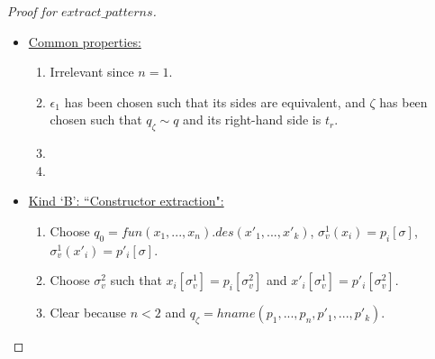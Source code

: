 \documentclass[11pt]{article} %
\begin{document}
\begin{proof}[Proof for $extract\_patterns$]
\begin{itemize}
\begin{itemize}
\item \underline{Common properties:}
\begin{enumerate}
\item Irrelevant since $n = 1$.
\item $\epsilon_1$ has been chosen such that its sides are equivalent, and $\zeta$ has been chosen such that $q_\zeta \sim q$ and its right-hand side is $t_r$.
\item
\item 
\end{enumerate}

\item \underline{Kind `B': ``Constructor extraction":}
\begin{enumerate}
\item Choose $q_0 = fun(x_1, ..., x_n).des(x'_1, ..., x'_k)$, $\sigma^1_v(x_i) = p_i[\sigma]$, $\sigma^1_v(x'_i) = p'_i[\sigma]$.
\item Choose $\sigma^2_v$ such that $x_i[\sigma^1_v] = p_i[\sigma^2_v]$ and $x'_i[\sigma^1_v] = p'_i[\sigma^2_v]$.
\item Clear because $n < 2$ and $q_\zeta = hname(p_1, ..., p_n, p'_1, ..., p'_k)$.
\end{enumerate}

\end{itemize}

\end{itemize}

\end{proof}
\end{document}

